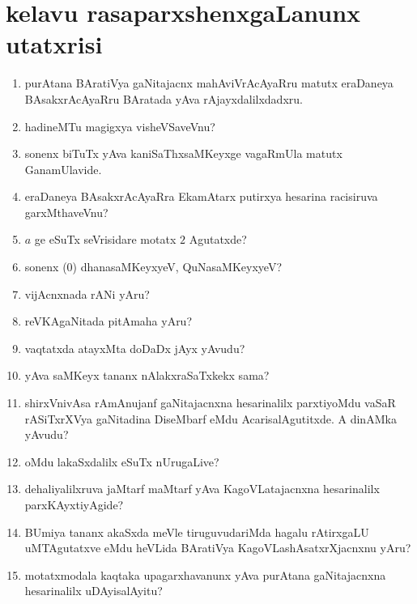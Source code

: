 \chapter{kelavu rasaparxshenxgaLanunx utatxrisi}\label{chap20}

\begin{enumerate}
  \renewcommand{\labelenumi}{\rm(\theenumi)}
    \itemsep=2pt
\item purAtana BAratiVya gaNitajacnx mahAviVrAcAyaRru matutx eraDaneya BAsakxrAcAyaRru BAratada yAva rAjayxdalilxdadxru.

\item hadineMTu magigxya visheVSaveVnu?

\item sonenx biTuTx yAva kaniSaThxsaMKeyxge vagaRmUla matutx GanamUlavide.

\item eraDaneya BAsakxrAcAyaRra EkamAtarx putirxya hesarina racisiruva garxMthaveVnu?
  
\item $a$ ge eSuTx seVrisidare motatx $2$ Agutatxde?
  
\item sonenx ($0$) dhanasaMKeyxyeV, QuNasaMKeyxyeV?
  
\item vijAcnxnada rANi yAru?
  
\item reVKAgaNitada pitAmaha yAru?
   
\item vaqtatxda atayxMta doDaDx jAyx yAvudu?
  
\item yAva saMKeyx tananx nAlakxraSaTxkekx sama?

\item shirxVnivAsa rAmAnujanf gaNitajacnxna hesarinalilx parxtiyoMdu vaSaR rASiTxrXVya gaNitadina DiseMbarf eMdu AcarisalAgutitxde. A dinAMka yAvudu?

\item oMdu lakaSxdalilx eSuTx nUrugaLive?
  
\item dehaliyalilxruva jaMtarf maMtarf yAva KagoVLatajacnxna hesarinalilx parxKAyxti\-yAgide?
  
\item BUmiya tananx akaSxda meVle tiruguvudariMda hagalu rAtirxgaLU uMTAgutatxve eMdu heVLida BAratiVya KagoVLashAsatxrXjacnxnu yAru?
  
\item motatxmodala kaqtaka upagarxhavanunx yAva purAtana gaNitajacnxna hesarinalilx uDAyisalAyitu?
  

\end{enumerate}
